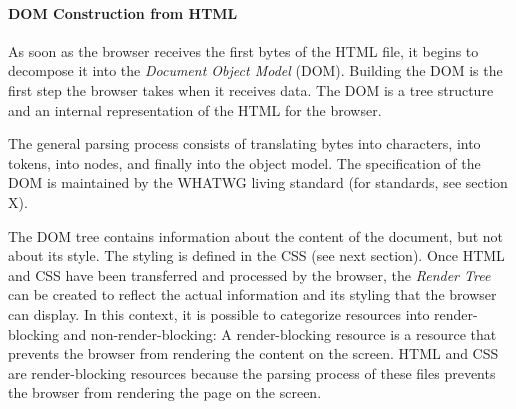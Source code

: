 


\paragraph{DOM Construction from HTML} %


As soon as the browser receives the first bytes of the HTML file, it begins to decompose it into the \textit{Document Object Model} (DOM).
Building the DOM is the first step the browser takes when it receives data.
The DOM is a tree structure and an internal representation of the HTML for the browser. %

The general parsing process consists of translating bytes into characters, into tokens, into nodes, and finally into the object model. %
The specification of the DOM is maintained by the WHATWG living standard (for standards, see section X). %




The DOM tree contains information about the content of the document, but not about its style.
The styling is defined in the CSS (see next section).
Once HTML and CSS have been transferred and processed by the browser, the \textit{Render Tree} can be created to reflect the actual information and its styling that the browser can display.
In this context, it is possible to categorize resources into render-blocking and non-render-blocking:
A render-blocking resource is a resource that prevents the browser from rendering the content on the screen.
HTML and CSS are render-blocking resources because the parsing process of these files prevents the browser from rendering the page on the screen. %

